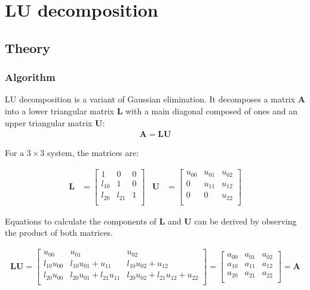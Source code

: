 \newpage
\section{LU decomposition}
\label{sec:LU}
\subsection{Theory}
\subsubsection{Algorithm}

LU decomposition is a variant of Gaussian elimination. It decomposes a matrix $\mathbf{A}$ into a lower triangular matrix $\mathbf{L}$ with a main diagonal composed of ones and an upper triangular matrix $\mathbf{U}$:
\begin{align}
\mathbf{A} = \mathbf{L}\mathbf{U}
\end{align}

For a $3\times3$ system, the matrices are:

\begin{align}
\mathbf{L} 
& =
\begin{bmatrix}
1     &0     &0\\
l_{10}&1     &0\\
l_{20}&l_{21}&1\\
\end{bmatrix}
&
\mathbf{U} 
& =
\begin{bmatrix}
u_{00}&u_{01}&u_{02}\\
0     &u_{11}&u_{12}\\
0     &0     &u_{22}\\
\end{bmatrix}
\end{align}

Equations to calculate the components of $\mathbf{L}$ and $\mathbf{U}$ can be derived by observing the product of both matrices.

\begin{align}
\mathbf{L} \mathbf{U}
=
\begin{bmatrix}
u_{00}      &u_{01}                   &u_{02}\\
l_{10}u_{00}&l_{10}u_{01}+u_{11}      &l_{10}u_{02}+u_{12}\\
l_{20}u_{00}&l_{20}u_{01}+l_{21}u_{11}&l_{20}u_{02}+l_{21}u_{12}+u_{22}\\
\end{bmatrix}
=
\begin{bmatrix}
a_{00}&a_{01}&a_{02}\\
a_{10}&a_{11}&a_{12}\\
a_{20}&a_{21}&a_{22}\\
\end{bmatrix}
= 
\mathbf{A} 
\end{align}


